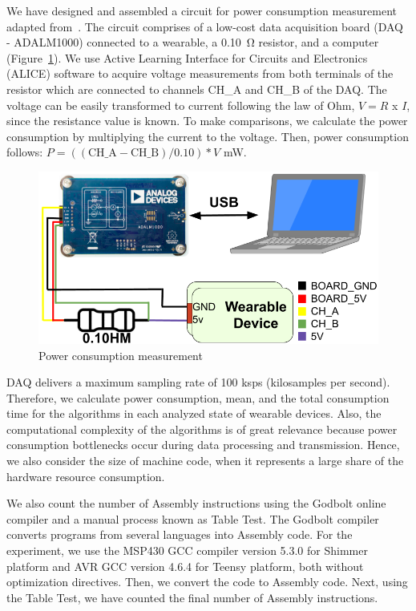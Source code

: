 \documentclass[journal]{IEEEtran}
\begin{document}
We have designed and assembled a circuit for power consumption measurement adapted from~\cite{bessa2017jetsonleap}. The circuit comprises of a low-cost data acquisition board (DAQ - ADALM1000) connected to a wearable, a 0.10~\si{\ohm} resistor, and a computer (Figure~\ref{fig:circuit}). We use Active Learning Interface for Circuits and Electronics (ALICE) software to acquire voltage measurements from both terminals of the resistor which are connected to channels CH\_A and CH\_B of the DAQ. The voltage can be easily transformed to current following the law of Ohm, $V = R$ x $I$, since the resistance value is known. 
To make comparisons, we calculate the power consumption by multiplying the current to the voltage. Then, power consumption follows: 
$P = ((\mbox{CH\_A} - \mbox{CH\_B}) / 0.10) * V $ mW.

\begin{figure}[!htb]
 \vspace{-0.3cm}
 \centering
 \includegraphics[scale=0.19]{Figures/circuit.png}
 \caption{Power consumption measurement}
 \label{fig:circuit}
 \vspace{-0.3cm}
\end{figure}

DAQ delivers a maximum sampling rate of 100 ksps (kilosamples per second). Therefore, we calculate power consumption, mean, and the total consumption time for the algorithms in each analyzed state of wearable devices. Also, the computational complexity of the algorithms is of great relevance because power consumption bottlenecks occur during data processing and transmission. Hence, we also consider the size of machine code, when it represents a large share of the hardware resource consumption.

We also count the number of Assembly instructions using the Godbolt online compiler and a manual process known as Table Test. The Godbolt compiler converts programs from several languages into Assembly code. For the experiment, we use the MSP430 GCC compiler version 5.3.0 for Shimmer platform and AVR GCC version 4.6.4 for Teensy platform, both without optimization directives. Then, we convert the code to Assembly code. Next, using the Table Test, we have counted the final number of Assembly instructions.
\end{document}
